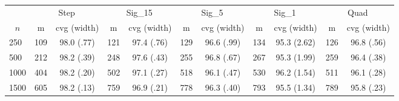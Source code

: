\begin{tabular}{lcccccccccc}
   \toprule
 
           & \multicolumn{2}{c}{Step}& \multicolumn{2}{c}{Sig\_15}& \multicolumn{2}{c}{Sig\_5}& \multicolumn{2}{c}{Sig\_1}& \multicolumn{2}{c}{Quad} \\ 
             \cmidrule(l{2pt}r{2pt}){2-3} \cmidrule(l{2pt}r{2pt}){4-5} \cmidrule(l{2pt}r{2pt}){6-7} \cmidrule(l{2pt}r{2pt}){8-9}  \cmidrule(l{2pt}r{2pt}){10-11} 
             \multicolumn{1}{c}{$n$} & \multicolumn{1}{c}{m}& \multicolumn{1}{c}{cvg (width)}& \multicolumn{1}{c}{m}& \multicolumn{1}{c}{cvg (width)}& \multicolumn{1}{c}{m}& \multicolumn{1}{c}{cvg (width)}& \multicolumn{1}{c}{m}& \multicolumn{1}{c}{cvg (width)}& \multicolumn{1}{c}{m}& \multicolumn{1}{c}{cvg (width)} \\ \midrule 
        250 & 109 & 98.0 (.77) & 121 & 97.4 (.76) & 129 & 96.6 (.99) & 134 & 95.3 (2.62) & 126 & 96.8 (.56) \\ 
  500 & 212 & 98.2 (.39) & 248 & 97.6 (.43) & 255 & 96.8 (.67) & 267 & 95.3 (1.99) & 259 & 96.4 (.38) \\ 
  1000 & 404 & 98.2 (.20) & 502 & 97.1 (.27) & 518 & 96.1 (.47) & 530 & 96.2 (1.54) & 511 & 96.1 (.28) \\ 
  1500 & 605 & 98.2 (.13) & 759 & 96.9 (.21) & 778 & 96.3 (.40) & 793 & 95.5 (1.34) & 789 & 95.8 (.23) \\ 
   \hline
\end{tabular}
